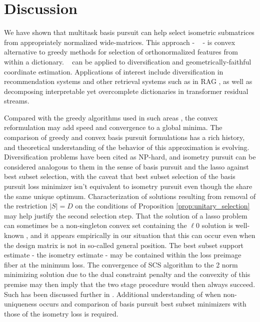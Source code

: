 \section{Discussion}
\label{sec:discussion}

We have shown that multitask basis pursuit can help select isometric submatrices from appropriately normalized wide-matrices.
This approach - \isometrypursuit~ - is convex alternative to greedy methods for selection of orthonormalized features from within a dictionary.
\isometrypursuit~ can be applied to diversification and geometrically-faithful coordinate estimation.
Applications of interest include diversification in recommendation systems \cite{Carbonell2017-gi, Wu2019-uk, Langchain} and other retrieval systems such as in RAG \cite{Gao2023-cn, Pickett2024-ad, In2024-um, Weiss2024-xm, Vectara}, as well as decomposing interpretable yet overcomplete dictionaries in transformer residual streams.

Compared with the greedy algorithms used in such areas \cite{Carbonell1998-ji, Barioni, Drosou, Qin2012-ok, KUNAVER2017154, Guo-shengbo, Abdool,Yu2016AGA,  Huang2024-wr, Pickett2024-ad}, the convex reformulation may add speed and convergence to a global minima.
The comparison of greedy \cite{Mallat93-wi, Mallat, Pati-93, Tropp05-ml} and convex \cite{Chen2001-hh, Tropp06-sg,Chen2006TheoreticalRO} basis pursuit formulations has a rich history, and theoretical understanding of the behavior of this approximation is evolving.
Diversification problems have been cited as NP-hard, and isometry pursuit can be considered analogous to them in the sense of basis pursuit and the lasso against best subset selection, with the caveat that best subset selection of the basis pursuit loss minimizer isn't equivalent to isometry pursuit even though the share the same unique optimum.
Characterization of solutions resulting from removal of the restriction $|S| = D$ on the conditions of Proposition \ref{prop:unitary_selection} may help justify the second selection step.
That the solution of a lasso problem can sometimes be a non-singleton convex set containing the $\ell 0 $ solution is well-known \cite{Osborne2000OnTL, DOSSAL2012117, Chrtien2011OnTG, Tibshirani2012TheLP, Ewald2017OnTD, Ali2018TheGL, Schneider2020-qt, Mishkin2022TheSP,Dupuis2019TheGO,Debarre2020OnTU,Everink2024TheGA}, and it appears empirically in our situation that this can occur even when the design matrix is not in so-called general position.
The best subset support estimate - the isometry estimate - may be contained within the loss preimage fiber at the minimum loss.
The convergence of SCS algorithm to the 2 norm minimizing solution due to the dual constraint penalty and the convexity of this premise may then imply that the two stage procedure would then always succeed.
Such has been discussed further in \cite{Donoho2006ForML, Mishkin2022TheSP}.
Additional understanding of when non-uniqueness occurs and comparison of basis pursuit best subset minimizers with those of the isometry loss is required.

